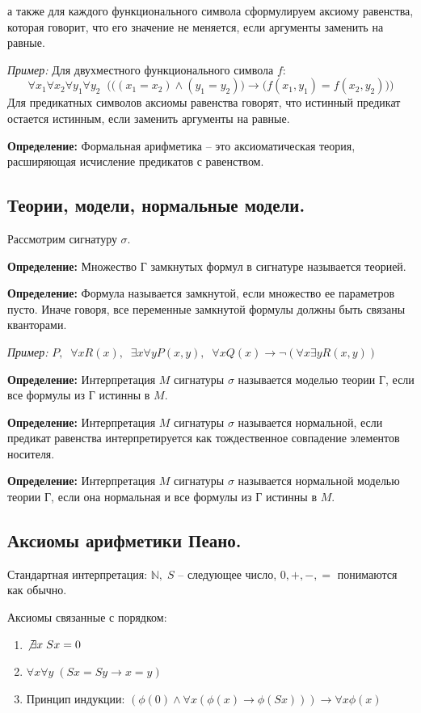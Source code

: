 \noindent а также для каждого функционального символа сформулируем аксиому равенства, которая говорит, что его значение не меняется, если аргументы заменить на равные.

\textit{Пример:} Для двухместного функционального символа $f$: $$\forall x_1 \forall x_2 \forall y_1\forall y_2\;\; \big(\big((x_1=x_2)\land(y_1=y_2)\big)\to \big(f(x_1,y_1)=f(x_2,y_2)\big)\big)$$
\noindent Для предикатных символов аксиомы равенства говорят, что истинный предикат остается истинным, если заменить аргументы на равные.

\textbf{Определение:} Формальная арифметика -- это аксиоматическая теория, расширяющая исчисление предикатов с равенством.

\subsection{Теории, модели, нормальные модели.}
Рассмотрим сигнатуру $\sigma$.

\textbf{Определение:} Множество Г замкнутых формул в сигнатуре называется теорией.

\textbf{Определение:} Формула называется замкнутой, если множество ее параметров пусто. Иначе говоря, все переменные замкнутой формулы должны быть связаны кванторами.

\textit{Пример:} $P,\;\; \forall xR(x),\;\; \exists x \forall y P(x,y),\;\; \forall x Q(x)\to \neg(\forall x \exists y R(x,y))$

\textbf{Определение:} Интерпретация $M$ сигнатуры $\sigma$ называется моделью теории Г, если все формулы из Г истинны в $M$.

\textbf{Определение:} Интерпретация $M$ сигнатуры $\sigma$ называется нормальной, если предикат равенства интерпретируется как тождественное совпадение элементов носителя.

\textbf{Определение:} Интерпретация $M$ сигнатуры $\sigma$ называется нормальной моделью теории Г, если она нормальная и все формулы из Г истинны в $M$.

\subsection{Аксиомы арифметики Пеано.}
Стандартная интерпретация: $\mathbb{N}, \; S$ -- следующее число, $0, +, -, =$ понимаются как обычно.

Аксиомы связанные с порядком:
\begin{enumerate}
    \item $\not\exists x \; Sx=0 $
    \item $\forall x \forall y \; (Sx=Sy \to x = y)$
    \item Принцип индукции: $(\phi(0)\land \forall x (\phi(x)\to\phi(Sx)))\to\forall x \phi(x) $
\end{enumerate}

